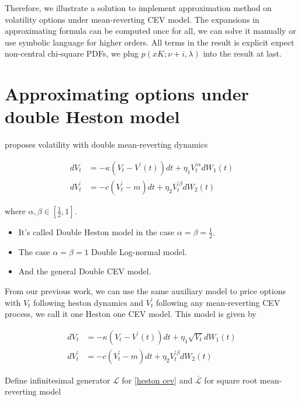 Therefore, we illustrate a solution to implement approximation method on volatility options under mean-reverting CEV model. The expansions in approximating formula can be computed once for all, we can solve it manually or use symbolic language for higher orders. All terms in the result is explicit expect non-central chi-square PDFs, we plug $p(xK;\nu+i,\lambda)$ into the result at last.

\section{Approximating options under double Heston model}\label{sec: 3.2}

\cite{gatheral_consistent_nodate} proposes volatility with double mean-reverting dynamics

$$
    \begin{aligned}
        d V_t &=-\kappa\left(V_t-V^{\prime}(t)\right) d t+\eta_{1} V^{\prime \alpha}_t  d W_1(t) \\
        d V^{\prime}_t &=-c\left(V^{\prime}_t-m\right) d t+\eta_{2} V^{\prime \beta}_t d W_{2}(t)
    \end{aligned}
$$

\noindent where $\alpha, \beta \in [\frac{1}{2},1]$.

\begin{itemize}
    \item It's called Double Heston model in the case $\alpha=\beta=\frac{1}{2}$.
    \item The case $\alpha=\beta=1$ Double Log-normal model.
    \item And the general Double CEV model.
\end{itemize}

From our previous work, we can use the same auxiliary model to price options with $V_t$ following heston dynamics and $V^{\prime}_t$ following any mean-reverting CEV process, we call it one Heston one CEV model. This model is given by

\begin{equation}\label{heston cev}
    \begin{aligned}
        d V_t &=-\kappa\left(V_t-V^{\prime}(t)\right) d t+\eta_{1} \sqrt{V_t} d W_1(t) \\
        d V^{\prime}_t &=-c\left(V^{\prime}_t-m\right) d t+\eta_{2} V^{\prime \beta}_t d W_{2}(t)
    \end{aligned}
\end{equation}

Define infinitesimal generator $\mathcal{L}$ for \eqref{heston cev} and $\bar{\mathcal{L}}$ for square root mean-reverting model


